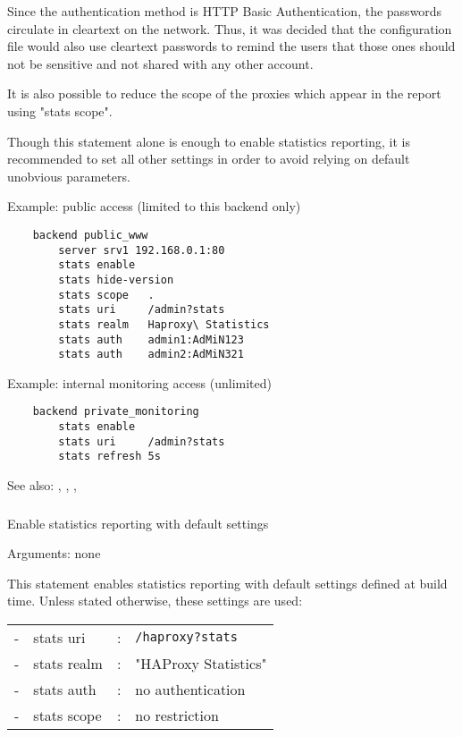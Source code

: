   Since the authentication method is HTTP Basic Authentication, the passwords
  circulate in cleartext on the network. Thus, it was decided that the
  configuration file would also use cleartext passwords to remind the users
  that those ones should not be sensitive and not shared with any other account.

  It is also possible to reduce the scope of the proxies which appear in the
  report using "stats scope".

  Though this statement alone is enough to enable statistics reporting, it is
  recommended to set all other settings in order to avoid relying on default
  unobvious parameters.

  Example: public access (limited to this backend only)
  \begin{verbatim}
    backend public_www
        server srv1 192.168.0.1:80
        stats enable
        stats hide-version
        stats scope   .
        stats uri     /admin?stats
        stats realm   Haproxy\ Statistics
        stats auth    admin1:AdMiN123
        stats auth    admin2:AdMiN321
   \end{verbatim}

   Example: internal monitoring access (unlimited)
   \begin{verbatim}
    backend private_monitoring
        stats enable
        stats uri     /admin?stats
        stats refresh 5s
   \end{verbatim}


See also: , , , 

\subsubsection[stats enable]{}


  Enable statistics reporting with default settings


  Arguments: none

  This statement enables statistics reporting with default settings defined
  at build time. Unless stated otherwise, these settings are used:
  
  \begin{tabular}{llll}
  - & stats uri   & : & \verb|/haproxy?stats| \\
  - & stats realm & : & "HAProxy Statistics" \\
  - & stats auth  & : & no authentication \\
  - & stats scope & : & no restriction \\
  \end{tabular}

